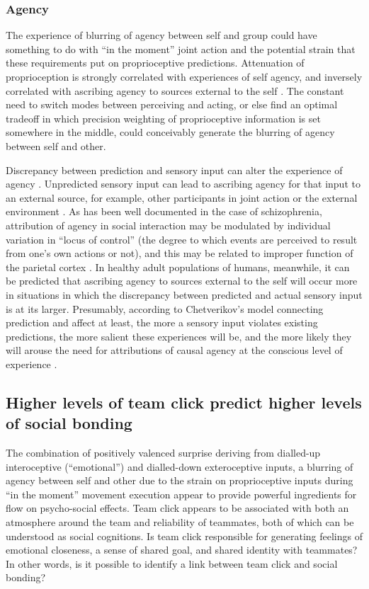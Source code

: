 \begin{CJK}{UTF8}{gbsn}
\subsubsection{Agency}
The experience of blurring of agency between self and group could have something to do with ``in the moment'' joint action and the potential strain that these requirements put on proprioceptive predictions.  Attenuation of proprioception is strongly correlated with experiences of self agency, and inversely correlated with ascribing agency to sources external to the self \citep{Brown2013}.  The constant need to switch modes between perceiving and acting, or else find an optimal tradeoff in which precision weighting of proprioceptive information is set somewhere in the middle, could conceivably generate the blurring of agency between self and other.

Discrepancy between prediction and sensory input can alter the experience of agency \citep{Sato2008}.  Unpredicted sensory input can lead to ascribing agency for that input to an external source, for example, other participants in joint action or the external environment \citep{Sato2005,Frith2007}.  As has been well documented in the case of schizophrenia, attribution of agency in social interaction may be modulated by individual variation in ``locus of control'' (the degree to which events are perceived to result from one’s own actions or not), and this may be related to improper function of the parietal cortex \citep{Frith2000}. In healthy adult populations of humans, meanwhile, it can be predicted that ascribing agency to sources external to the self will occur more in situations in which the discrepancy between predicted and actual sensory input is at its larger.  Presumably, according to Chetverikov's model connecting prediction and affect at least, the more a sensory input violates existing predictions, the more salient these experiences will be, and the more likely they will arouse the need for attributions of causal agency at the conscious level of experience \citep{Pesquita2017}.



\subsection{Higher levels of team click predict higher levels of social bonding \label{sect:teamClickSocialBonding}}

The combination of positively valenced surprise deriving from dialled-up interoceptive (``emotional'') and dialled-down exteroceptive inputs, a blurring of agency between self and other due to the strain on proprioceptive inputs during ``in the moment'' movement execution appear to provide powerful ingredients for flow on psycho-social effects.  Team click appears to be associated with both an atmosphere around the team and reliability of teammates, both of which can be understood as social cognitions.  Is team click responsible for generating feelings of emotional closeness, a sense of shared goal, and shared identity with teammates?  In other words, is it possible to identify a link between team click and social bonding?


\end{CJK}
